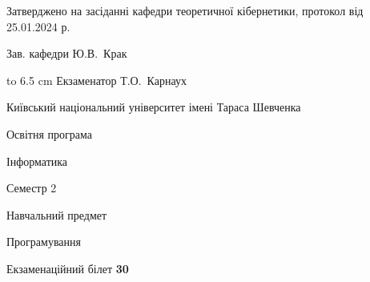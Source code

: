 \documentclass[12pt, ukrainian]{article}
\begin{document}
{\smallskip\smallskip \begin {scriptsize} Затверджено на засіданні кафедри теоретичної кібернетики, протокол   від   25.01.2024 р.\par\smallskip\smallskip\smallskip\smallskip
{\parbox {6.5 cm} {Зав. кафедри \dotfill Ю.В.~Крак}}\hspace {0.7cm} {\hbox to 6.5 cm { Екзаменатор \dotfill Т.О.~Карнаух}} \end{scriptsize}}
\newpage
{{\begin {scriptsize}\par
{ \center  Київський національний університет імені Тараса Шевченка \par}
{\parbox {5 cm}{Освітня програма \hfill}{\parbox {7 cm}{Інформатика\hfill}}\parbox {6 cm}{\hfill Семестр 2}}\par
{\parbox {5 cm} {Навчальний предмет \hfill}\parbox {7 cm}{Програмування \hfill}\parbox {6cm}{\hfill}\par}\vspace{-15pt} \end{scriptsize}}{\center Екзаменаційний білет \No \textbf { 30 }\par}}
\end{document}

